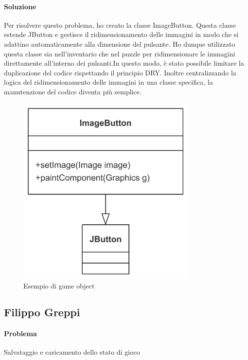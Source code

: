 \documentclass[a4paper,12pt]{report}
\begin{document}
\paragraph{Soluzione}Per risolvere questo problema, ho creato la classe ImageButton. Questa classe estende JButton e gestisce il ridimensionamento delle immagini in modo che si adattino automaticamente alla dimensione del pulsante. Ho dunque utilizzato questa classe sia nell'inventario che nel puzzle per ridimensionare le immagini direttamente all'interno dei pulsanti.In questo modo, è stato possibile limitare la duplicazione del codice rispettando il principio DRY. Inoltre centralizzando la logica del ridimensionamento delle immagini in una classe specifica, la manutenzione del codice diventa più semplice. 
\begin{figure}[h]  %
    \centering
    \includegraphics[width=0.8\textwidth]{img/button.png}  %
    \caption{Esempio di game object}
    \label{img:gameObject}
\end{figure}
%
\subsection{Filippo Greppi}
%
%
\paragraph{Problema} Salvataggio e caricamento dello stato di gioco
\end{document}
